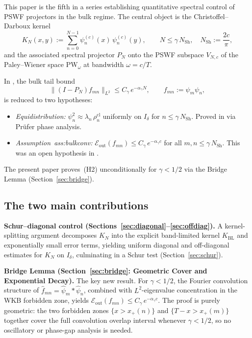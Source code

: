 \documentclass[12pt,a4paper]{article}
\theoremstyle{definition}
\newcommand{\NSh}{N_{\mathrm{Sh}}}
\newcommand{\KBL}{K_{\mathrm{BL}}}
\newcommand{\rhocl}{\rho_n^{\mathrm{cl}}}
\newcommand{\Eout}{\mathcal{E}_{\mathrm{out}}}
\begin{document}
This paper is the fifth in a series
\cite{PaperI,PaperII,PaperIII,PaperIV} establishing
quantitative spectral control of PSWF projectors in the
bulk regime. The central object is the
Christoffel--Darboux kernel
\[
  K_N(x,y)
  := \sum_{n=0}^{N-1}\psi_n^{(c)}(x)\,\psi_n^{(c)}(y),
  \qquad N \le \gamma\,\NSh,\quad
  \NSh := \frac{2c}{\pi},
\]
and the associated spectral projector $P_N$ onto the PSWF
subspace $V_{N,c}$ of the Paley--Wiener space
$\mathrm{PW}_\omega$ at bandwidth $\omega = c/T$.

In \cite{PaperIII}, the bulk tail bound
\[
  \|(I - P_N)f_{mn}\|_{L^2}
  \le C_\gamma\,e^{-\alpha_\gamma N},
  \qquad f_{mn} := \psi_m\psi_n,
\]
is reduced to two hypotheses:
\begin{itemize}
  \item[(H1)] \textit{Equidistribution:}
  $\psi_n^2 \approx \lambda_n\,\rhocl$ uniformly on
  $I_\delta$ for $n \le \gamma\,\NSh$.
  Proved in \cite{PaperIV} via Pr\"ufer phase analysis.
  \item[(H2)] \textit{Assumption~ass:bulkconv:}
  $\Eout(f_{mn}) \le C_\gamma\,e^{-\alpha_\gamma c}$
  for all $m,n \le \gamma\,\NSh$.
  This was an open hypothesis in \cite{PaperIII}.
\end{itemize}
The present paper proves~(H2) unconditionally for
$\gamma < 1/2$ via the Bridge Lemma
(Section~\ref{sec:bridge}).

\subsection{The two main contributions}

\medskip\noindent
\textbf{Schur--diagonal control
(Sections~\ref{sec:diagonal}--\ref{sec:offdiag}).}
A kernel-splitting argument decomposes $K_N$ into the
explicit band-limited kernel $\KBL$ and exponentially
small error terms, yielding uniform diagonal and
off-diagonal estimates for $K_N$ on $I_\delta$,
culminating in a Schur test (Section~\ref{sec:schur}).

\medskip\noindent
\textbf{Bridge Lemma
(Section~\ref{sec:bridge}: Geometric Cover and
Exponential Decay).}
The key new result. For $\gamma < 1/2$, the Fourier
convolution structure of
$\widehat{f}_{mn} = \widehat\psi_m * \widehat\psi_n$,
combined with $L^2$-eigenvalue concentration in the
WKB forbidden zone, yields
$\Eout(f_{mn}) \le C_\gamma\,e^{-\alpha_\gamma c}$.
The proof is purely geometric: the two forbidden zones
$\{x > x_+(n)\}$ and $\{T-x > x_+(m)\}$ together cover
the full convolution overlap interval whenever
$\gamma < 1/2$, so no oscillatory or phase-gap analysis
is needed.
\end{document}
